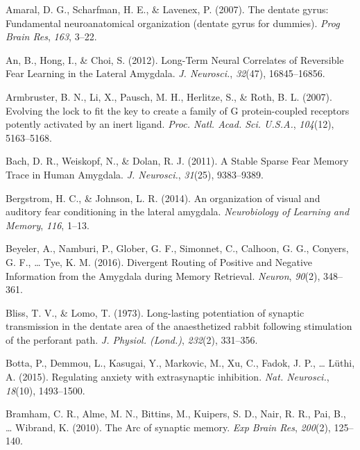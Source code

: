 \documentclass[12pt,a4paperpaper,]{report}
\begin{document}
\hypertarget{ref-amaralux5fdentateux5f2007}{}
Amaral, D. G., Scharfman, H. E., \& Lavenex, P. (2007). The dentate
gyrus: Fundamental neuroanatomical organization (dentate gyrus for
dummies). \emph{Prog Brain Res}, \emph{163}, 3--22.

\hypertarget{ref-anux5flong-termux5f2012}{}
An, B., Hong, I., \& Choi, S. (2012). Long-Term Neural Correlates of
Reversible Fear Learning in the Lateral Amygdala. \emph{J. Neurosci.},
\emph{32}(47), 16845--16856.

\hypertarget{ref-armbrusterux5fevolvingux5f2007}{}
Armbruster, B. N., Li, X., Pausch, M. H., Herlitze, S., \& Roth, B. L.
(2007). Evolving the lock to fit the key to create a family of G
protein-coupled receptors potently activated by an inert ligand.
\emph{Proc. Natl. Acad. Sci. U.S.A.}, \emph{104}(12), 5163--5168.

\hypertarget{ref-bachux5fstableux5f2011}{}
Bach, D. R., Weiskopf, N., \& Dolan, R. J. (2011). A Stable Sparse Fear
Memory Trace in Human Amygdala. \emph{J. Neurosci.}, \emph{31}(25),
9383--9389.

\hypertarget{ref-bergstromux5forganizationux5f2014}{}
Bergstrom, H. C., \& Johnson, L. R. (2014). An organization of visual
and auditory fear conditioning in the lateral amygdala.
\emph{Neurobiology of Learning and Memory}, \emph{116}, 1--13.

\hypertarget{ref-beyelerux5fdivergentux5f2016}{}
Beyeler, A., Namburi, P., Glober, G. F., Simonnet, C., Calhoon, G. G.,
Conyers, G. F., \ldots{} Tye, K. M. (2016). Divergent Routing of
Positive and Negative Information from the Amygdala during Memory
Retrieval. \emph{Neuron}, \emph{90}(2), 348--361.

\hypertarget{ref-blissux5flong-lastingux5f1973}{}
Bliss, T. V., \& Lomo, T. (1973). Long-lasting potentiation of synaptic
transmission in the dentate area of the anaesthetized rabbit following
stimulation of the perforant path. \emph{J. Physiol. (Lond.)},
\emph{232}(2), 331--356.

\hypertarget{ref-bottaux5fregulatingux5f2015}{}
Botta, P., Demmou, L., Kasugai, Y., Markovic, M., Xu, C., Fadok, J. P.,
\ldots{} Lüthi, A. (2015). Regulating anxiety with extrasynaptic
inhibition. \emph{Nat. Neurosci.}, \emph{18}(10), 1493--1500.

\hypertarget{ref-bramhamux5farcux5f2010}{}
Bramham, C. R., Alme, M. N., Bittins, M., Kuipers, S. D., Nair, R. R.,
Pai, B., \ldots{} Wibrand, K. (2010). The Arc of synaptic memory.
\emph{Exp Brain Res}, \emph{200}(2), 125--140.
\end{document}
